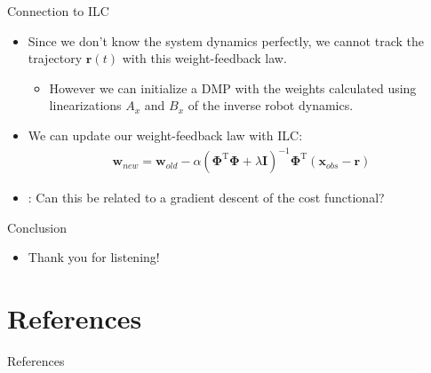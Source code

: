 \documentclass[handout]{beamer}
\newcommand{\todo}{\color{red}{TODO}} %
\newcommand{\basis}{\mathbf{\Phi}} %
\newcommand{\state}{\mathbf{x}} %
\newcommand{\traj}{\mathbf{r}} %
\newcommand{\weights}{\mathbf{w}} %
\begin{document}
%
\begin{frame}{Connection to ILC}
\begin{itemize}
\item Since we don't know the system dynamics perfectly, we cannot track the trajectory $\traj(t)$ with this weight-feedback law. \pause
\begin{itemize}
	\item However we can initialize a DMP with the weights calculated using linearizations $A_x$ and $B_x$ of the inverse robot dynamics. \pause
\end{itemize}
\item We can update our weight-feedback law with ILC: \pause
\begin{equation*}
\begin{aligned}
\weights_{new} = \weights_{old} - \alpha(\basis^{\mathrm{T}}\basis + \lambda\mathbf{I})^{-1}\basis^{\mathrm{T}}(\state_{obs} - \traj)
\end{aligned}
\end{equation*} \pause
\item \todo: Can this be related to a gradient descent of the cost functional?
\end{itemize}
\end{frame}	
%
\begin{frame}{Conclusion}
\begin{itemize}
\item Thank you for listening!
\end{itemize}
\end{frame}	
%
\section{References}
\begin{frame}[allowframebreaks]{References}
\def\newblock{\hskip .11em plus .33em minus .07em}

\end{frame}
%

%
\end{document}
